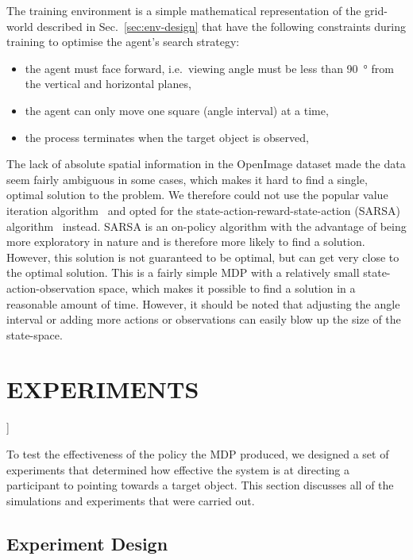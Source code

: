 \documentclass[a4paper, twoside]{article}
\begin{document}
The training environment is a simple mathematical representation of the grid-world described in Sec.~\ref{sec:env-design} that have the following constraints during training to optimise the agent's search strategy:

\begin{itemize}
  \item the agent must face forward, i.e.\ viewing angle must be less than \SI{90}{\degree} from the vertical and horizontal planes,
  \item the agent can only move one square (angle interval) at a time, 
  \item the process terminates when the target object is observed,
\end{itemize}

The lack of absolute spatial information in the OpenImage dataset made the data seem fairly ambiguous in some cases, which makes it hard to find a single, optimal solution to the problem. We therefore could not use the popular value iteration algorithm~\cite{bellman1957markovian} and opted for the state-action-reward-state-action (SARSA) algorithm~\cite{rummery1994line} instead. SARSA is an on-policy algorithm with the advantage of being more exploratory in nature and is therefore more likely to find a solution. However, this solution is not guaranteed to be optimal, but can get very close to the optimal solution. This is a fairly simple MDP with a relatively small state-action-observation space, which makes it possible to find a solution in a reasonable amount of time. However, it should be noted that adjusting the angle interval or adding more actions or observations can easily blow up the size of the state-space. 

\section{\uppercase{Experiments}}]\label{sec:experiments}

\noindent To test the effectiveness of the policy the MDP produced, we designed a set of experiments that determined how effective the system is at directing a participant to pointing towards a target object. This section discusses all of the simulations and experiments that were carried out. 

\subsection{Experiment Design}
\end{document}

